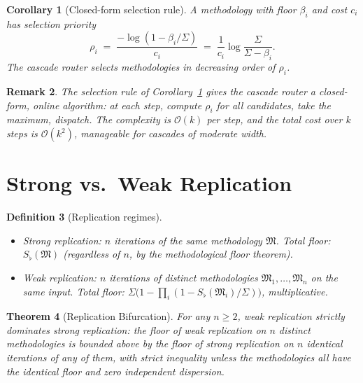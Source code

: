 \documentclass[twocolumn,11pt,a4paper]{article}
\newtheorem{theorem}{Theorem}[section]
\newtheorem{corollary}[theorem]{Corollary}
\newtheorem{definition}[theorem]{Definition}
\newtheorem{remark}[theorem]{Remark}
\newcommand{\Method}{\mathfrak{M}}
\newcommand{\Sigmax}{\Sigma}
\newcommand{\Sfloor}{S_{\flat}}
\begin{document}
\begin{corollary}[Closed-form selection rule]
\label{cor:closed-form-selection}
A methodology with floor $\beta_i$ and cost $c_i$ has selection priority
\[
\rho_i \;=\; \frac{-\log(1 - \beta_i/\Sigmax)}{c_i} \;=\; \frac{1}{c_i} \log\frac{\Sigmax}{\Sigmax - \beta_i}.
\]
The cascade router selects methodologies in decreasing order of $\rho_i$.
\end{corollary}

\begin{remark}
\label{rem:selection-rule-implementation}
The selection rule of Corollary~\ref{cor:closed-form-selection} gives the cascade router a closed-form, online algorithm: at each step, compute $\rho_i$ for all candidates, take the maximum, dispatch. The complexity is $\mathcal{O}(k)$ per step, and the total cost over $k$ steps is $\mathcal{O}(k^2)$, manageable for cascades of moderate width.
\end{remark}

\section{Strong vs.\ Weak Replication}
\label{sec:replication}

\begin{definition}[Replication regimes]
\label{def:replication}
\begin{itemize}[nosep, leftmargin=*]
\item \emph{Strong replication}: $n$ iterations of the same methodology $\Method$. Total floor: $\Sfloor(\Method)$ (regardless of $n$, by the methodological floor theorem).
\item \emph{Weak replication}: $n$ iterations of distinct methodologies $\Method_1, \ldots, \Method_n$ on the same input. Total floor: $\Sigmax \bigl(1 - \prod_i (1 - \Sfloor(\Method_i)/\Sigmax)\bigr)$, multiplicative.
\end{itemize}
\end{definition}

\begin{theorem}[Replication Bifurcation]
\label{thm:replication-bifurcation}
For any $n \geq 2$, weak replication strictly dominates strong replication: the floor of weak replication on $n$ distinct methodologies is bounded above by the floor of strong replication on $n$ identical iterations of any of them, with strict inequality unless the methodologies all have the identical floor and zero independent dispersion.
\end{theorem}
\end{document}

